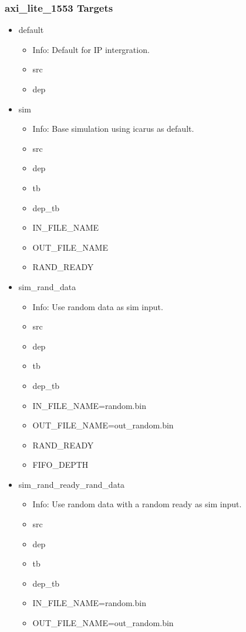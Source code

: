 \subsubsection{axi\_lite\_1553 Targets}
\begin{itemize}
\item default
	\begin{itemize}
	\item[$\space$] Info: Default for IP intergration.
	\item src
	\item dep
	\end{itemize}
\item sim
	\begin{itemize}
	\item[$\space$] Info: Base simulation using icarus as default.
	\item src
	\item dep
	\item tb
	\item dep\_tb
	\item IN\_FILE\_NAME
	\item OUT\_FILE\_NAME
	\item RAND\_READY
	\end{itemize}
\item sim\_rand\_data
	\begin{itemize}
	\item[$\space$] Info: Use random data as sim input.
	\item src
	\item dep
	\item tb
	\item dep\_tb
	\item IN\_FILE\_NAME=random.bin
	\item OUT\_FILE\_NAME=out\_random.bin
	\item RAND\_READY
	\item FIFO\_DEPTH
	\end{itemize}
\item sim\_rand\_ready\_rand\_data
	\begin{itemize}
	\item[$\space$] Info: Use random data with a random ready as sim input.
	\item src
	\item dep
	\item tb
	\item dep\_tb
	\item IN\_FILE\_NAME=random.bin
	\item OUT\_FILE\_NAME=out\_random.bin

\end{itemize}
\end{itemize}
